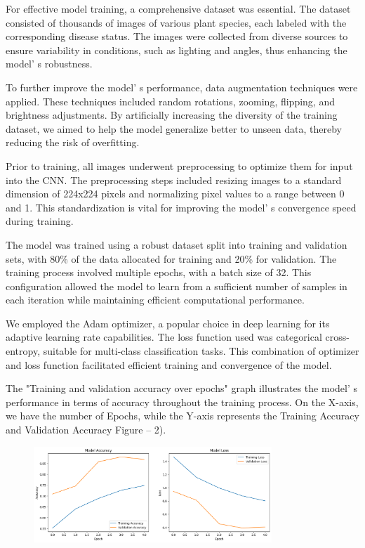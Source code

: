 {{For effective model training, a comprehensive dataset was essential. The
dataset consisted of thousands of images of various plant species, each
labeled with the corresponding disease status. The images were collected
from diverse sources to ensure variability in conditions, such as
lighting and angles, thus enhancing the model' s
robustness.

To further improve the model' s performance, data
augmentation techniques were applied. These techniques included random
rotations, zooming, flipping, and brightness adjustments. By
artificially increasing the diversity of the training dataset, we aimed
to help the model generalize better to unseen data, thereby reducing the
risk of overfitting.

Prior to training, all images underwent preprocessing to optimize them
for input into the CNN. The preprocessing steps included resizing images
to a standard dimension of 224x224 pixels and normalizing pixel values
to a range between 0 and 1. This standardization is vital for improving
the model' s convergence speed during training.

The model was trained using a robust dataset split into training and
validation sets, with 80\% of the data allocated for training and 20\%
for validation. The training process involved multiple epochs, with a
batch size of 32. This configuration allowed the model to learn from a
sufficient number of samples in each iteration while maintaining
efficient computational performance.

We employed the Adam optimizer, a popular choice in deep learning for
its adaptive learning rate capabilities. The loss function used was
categorical cross-entropy, suitable for multi-class classification
tasks. This combination of optimizer and loss function facilitated
efficient training and convergence of the model.

The "Training and validation accuracy over epochs" graph illustrates the
model' s performance in terms of accuracy throughout the
training process. On the X-axis, we have the number of Epochs, while the
Y-axis represents the Training Accuracy and Validation Accuracy Figure
-- 2).

\begin{figure}[H]
	\centering
	\includegraphics[width=0.8\textwidth]{media/ict/image32}
	\caption*{}
\end{figure}


}}
